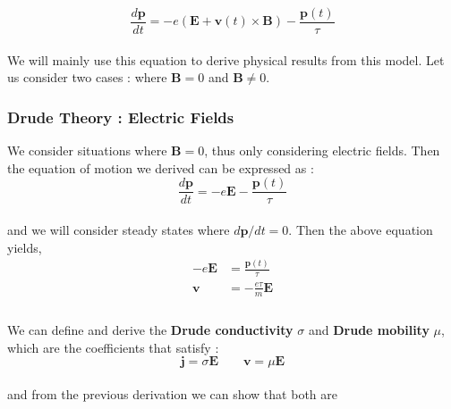 \documentclass[paper=a4, fontsize=11pt]{scrartcl}
\begin{document}
\begin{equation}\nonumber
	\frac{d\mathbf{p}}{dt} = -e \left( \mathbf{E}  + \mathbf{v}(t) \times \mathbf{B}\right) - \frac{\mathbf{p}(t)}{\tau}
\end{equation}\\

We will mainly use this equation to derive physical results from this model. Let us consider two cases : where $\mathbf{B}=0$ and  $\mathbf{B}\neq0$.

\vspace{0.15in}
\subsubsection{Drude Theory : Electric Fields}
\vspace{0.15in}

We consider situations where $\mathbf{B}=0$, thus only considering electric fields. Then the equation of motion we derived can be expressed as : \\

\begin{equation}\nonumber
	\frac{d\mathbf{p}}{dt} = -e  \mathbf{E}   - \frac{\mathbf{p}(t)}{\tau}
\end{equation}\\

and we will consider steady states where $d\mathbf{p}/dt = 0$. Then the above equation yields,\\

\begin{equation}\nonumber
\begin{split}
 -e  \mathbf{E}  &= \frac{\mathbf{p}(t)}{\tau} \\[2.5ex]
  \mathbf{v} &= - \frac{e \tau}{m} \mathbf{E} \\
\end{split}
\end{equation}\\

We can define and derive the \textbf{Drude conductivity} $\sigma$ and \textbf{Drude mobility} $\mu$, which are the coefficients that satisfy : \\

\begin{equation}\nonumber
	  \mathbf{j} = \sigma \mathbf{E} \qquad \mathbf{v} = \mu \mathbf{E}
\end{equation}\\

and from the previous derivation we can show that both are \\
\end{document}
